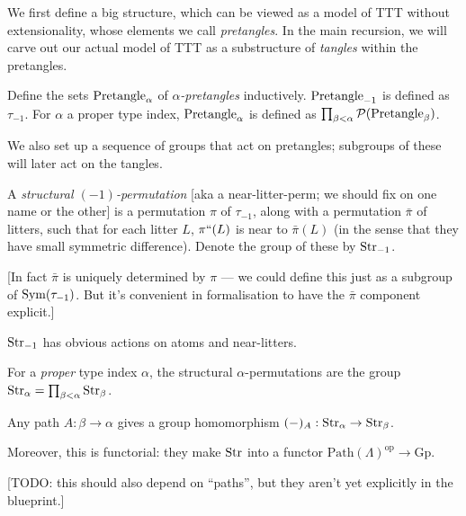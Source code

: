 We first define a big structure, which can be viewed as a model of TTT without extensionality, whose elements we call \emph{pretangles}.  In the main recursion, we will carve out our actual model of TTT as a substructure of \emph{tangles} within the pretangles.

\begin{definition}
  \label{def:pretangle}
  \leanok
  Define the sets $\mathrm{Pretangle}_\alpha$ of \emph{$\alpha$-pretangles} inductively. $\mathrm{Pretangle}_{-1}$ is defined as $\tau_{-1}$. For $\alpha$ a proper type index, $\mathrm{Pretangle}_\alpha$ is defined as $\prod_{\beta < \alpha} \mathcal P(\mathrm{Pretangle}_\beta)$.
\end{definition}

We also set up a sequence of groups that act on pretangles; subgroups of these will later act on the tangles.

\begin{definition}
  \label{def:structural-perm-atoms}
  \leanok

  A \emph{structural $(-1)$-permutation} [aka a near-litter-perm; we should fix on one name or the other] is a permutation $\pi$ of $\tau_{-1}$, along with a permutation $\bar{\pi}$ of litters, such that for each litter $L$, $\pi``(L)$ is near to $\bar{\pi}(L)$ (in the sense that they have small symmetric difference).  Denote the group of these by $\mathrm{Str}_{-1}$.

  [In fact $\bar{\pi}$ is uniquely determined by $\pi$ — we could define this just as a subgroup of $\mathrm{Sym}(\tau_{-1})$.  But it’s convenient in formalisation to have the $\bar{\pi}$ component explicit.]

  $\mathrm{Str}_{-1}$ has obvious actions on atoms and near-litters.
\end{definition}

\begin{definition}
  \label{def:structural-perm}
  \leanok
  For a \emph{proper} type index $\alpha$, the structural $\alpha$-permutations are the group $\mathrm{Str}_\alpha = \prod_{\beta < \alpha} \mathrm{Str}_\beta$.
\end{definition}

\begin{definition}
  \label{def:structural-perm-derivative}
  \leanok
  Any path $A : \beta \to \alpha$ gives a group homomorphism $(-)_A : \mathrm{Str}_\alpha \to \mathrm{Str}_\beta$.

  Moreover, this is functorial: they make $\mathrm{Str}$ into a functor $\mathrm{Path}(\Lambda)^\mathrm{op} \to \mathrm{Gp}$.

  [TODO: this should also depend on “paths”, but they aren’t yet explicitly in the blueprint.]
\end{definition}

